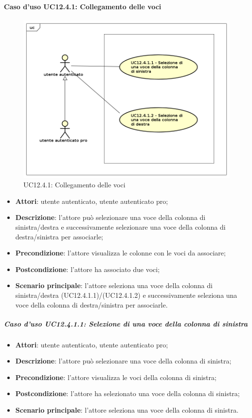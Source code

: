 \paragraph{Caso d'uso UC12.4.1: Collegamento delle voci}
\begin{figure}[h]
	\centering
	\includegraphics[scale=0.5]{UML/UC12_4_1.png}
	\caption{UC12.4.1: Collegamento delle voci}
\end{figure}
\begin{itemize}
\item \textbf{Attori}: utente autenticato, utente autenticato pro;
\item \textbf{Descrizione}: l'attore può selezionare una voce della colonna di sinistra/destra e successivamente selezionare una voce della colonna di destra/sinistra per associarle;
\item \textbf{Precondizione}: l'attore visualizza le colonne con le voci da associare;
\item \textbf{Postcondizione}: l'attore ha associato due voci;
\item \textbf{Scenario principale}: l'attore seleziona una voce della colonna di sinistra/destra (UC12.4.1.1)/(UC12.4.1.2) e successivamente seleziona una voce della colonna di destra/sinistra per associarle.
\end{itemize}

\subparagraph{Caso d'uso UC12.4.1.1: Selezione di una voce della colonna di sinistra}
\begin{itemize}
\item \textbf{Attori}: utente autenticato, utente autenticato pro;
\item \textbf{Descrizione}: l'attore può selezionare una voce della colonna di sinistra;
\item \textbf{Precondizione}: l'attore visualizza le voci della colonna di sinistra;
\item \textbf{Postcondizione}: l'attore ha selezionato una voce della colonna di sinistra;
\item \textbf{Scenario principale}: l'attore seleziona una voce della colonna di sinistra. 
\end{itemize}

